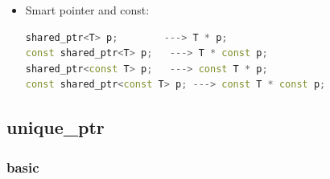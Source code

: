 \documentclass[a4paper,11pt,twoside]{book}
\begin{document}
\begin{itemize}
\item Smart pointer and const:
\begin{lstlisting}[frame=single, language=c++]
shared_ptr<T> p;        ---> T * p;
const shared_ptr<T> p;   ---> T * const p;
shared_ptr<const T> p;   ---> const T * p;
const shared_ptr<const T> p; ---> const T * const p;
\end{lstlisting}

\end{itemize}

\subsection{unique\_ptr}

\subsubsection{basic}
\end{document}
